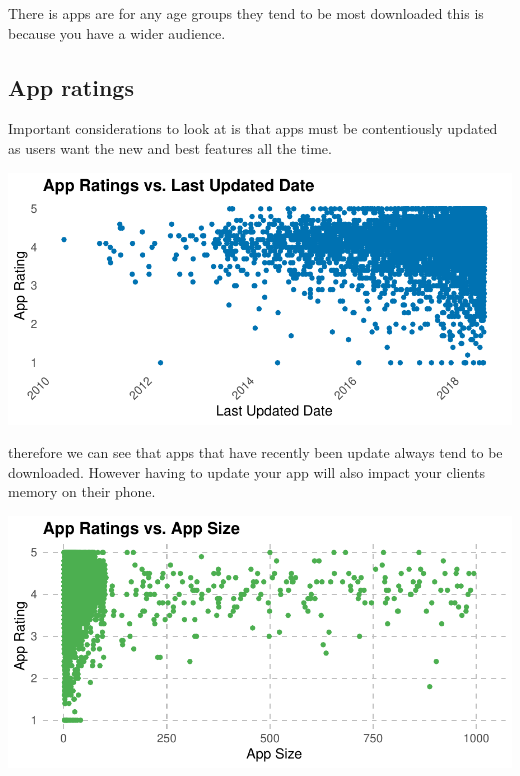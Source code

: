 \documentclass[11pt,preprint, authoryear]{elsarticle}
\let\origfigure\figure
\let\endorigfigure\endfigure
\renewenvironment{figure}[1][2] {
    \expandafter\origfigure\expandafter[H]
} {
    \endorigfigure
}
\numberwithin{equation}{section}
\numberwithin{figure}{section}
\numberwithin{table}{section}
\begin{document}
There is apps are for any age groups they tend to be most downloaded
this is because you have a wider audience.

\hypertarget{app-ratings}{%
\subsection{App ratings}\label{app-ratings}}

Important considerations to look at is that apps must be contentiously
updated as users want the new and best features all the time.

\begin{figure}[H]

{\centering \includegraphics{Q5_files/figure-latex/Figure3-1} 

}

\caption{Ratings to update   \label{Figure3}}\label{fig:Figure3}
\end{figure}

therefore we can see that apps that have recently been update always
tend to be downloaded. However having to update your app will also
impact your clients memory on their phone.

\begin{figure}[H]

{\centering \includegraphics{Q5_files/figure-latex/Figure4-1} 

}

\caption{Rating to Size   \label{Figure4}}\label{fig:Figure4}
\end{figure}
\end{document}
